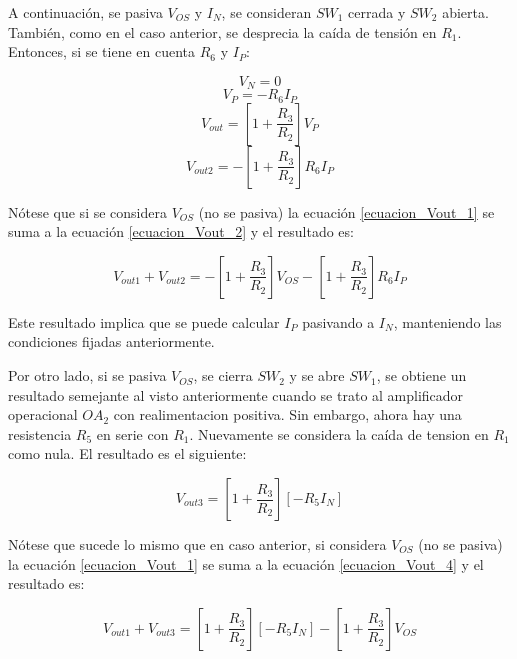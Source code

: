 A continuación, se pasiva $V_{OS}$ y $I_N$, se consideran $SW_1$ cerrada y $SW_2$ abierta. También, como en el caso anterior, se desprecia la caída de tensión en $R_1$. 
Entonces, si se tiene en cuenta $R_6$ y $I_P$:

\begin{displaymath} V_{N} = 0 \end{displaymath}
\begin{displaymath} V_{P} = - R_6 I_P \end{displaymath}
\begin{displaymath} V_{out} = [1+\frac{R_3}{R_2}] V_{P} \end{displaymath}  
\begin{equation}  V_{out2} = - [1+\frac{R_3}{R_2}] R_6 I_P \label{ecuacion_Vout_2}\end{equation}
 

Nótese que si se considera $V_{OS}$ (no se pasiva) la ecuación \ref{ecuacion_Vout_1} se suma a la ecuación \ref{ecuacion_Vout_2} y el resultado es:

\begin{equation} V_{out1} + V_{out2} = -[1 + \frac{R_3}{R_2}]V_{OS} - [1 + \frac{R_3}{R_2}]R_6I_P \label{ecuacion_Vout_3}\end{equation}

Este resultado implica que se puede calcular $I_P$ pasivando a $I_N$, manteniendo las condiciones fijadas anteriormente.

Por otro lado, si se pasiva $V_{OS}$, se cierra $SW_2$ y se abre $SW_1$, se obtiene un resultado semejante al visto anteriormente cuando se trato al amplificador operacional $OA_2$ con realimentacion positiva.
Sin embargo, ahora hay una resistencia $R_5$ en serie con $R_1$. Nuevamente se considera la caída de tension en $R_1$ como nula. El resultado es el siguiente:

\begin{equation} V_{out3} = [1 + \frac{R_3}{R_2}] [-R_5 I_N ]\label{ecuacion_Vout_4}\end{equation}

Nótese que sucede lo mismo que en caso anterior, si considera $V_{OS}$ (no se pasiva) la ecuación \ref{ecuacion_Vout_1} se suma a la ecuación \ref{ecuacion_Vout_4} y el resultado es:

\begin{equation} V_{out1} + V_{out3} = [1 + \frac{R_3}{R_2}] [-R_5 I_N ]  - [1 + \frac{R_3}{R_2}]V_{OS} \label{ecuacion_Vout_5}\end{equation} %

